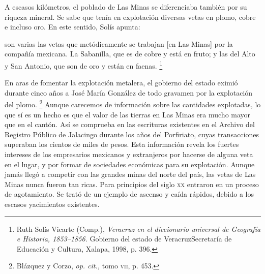 \documentclass[14pt,twoside,final]{extbook} %
\let\oldfootnote\footnote
\renewcommand\footnote[1]{%
\oldfootnote{\hspace{1mm}#1}}
\begin{document}
A escasos kilómetros, el poblado de Las Minas se diferenciaba también por su riqueza mineral. Se sabe que tenía en explotación diversas vetas en plomo, cobre e incluso oro. En este sentido, Solís apunta:
\begin{quoting}
son varias las vetas que metódicamente se trabajan [en Las Minas] por la compañía mexicana. La Sabanilla, que es de cobre y está en fruto; y las del Alto y San Antonio, que son de oro y están en faenas.\footnote{Ruth Solís Vicarte (Comp.), \emph{Veracruz en el diccionario universal de Geografía e Historia, 1853--1856.} Gobierno del estado de Veracruz\kernedslash Secretaría de Educación y Cultura, Xalapa, 1998, p. 396.}
\end{quoting}
En aras de fomentar la explotación metalera, el gobierno del estado eximió durante cinco años a José María González de todo gravamen por la explotación del plomo.\footnote{Blázquez y Corzo, \emph{op. cit.,} tomo \textsc{vii}, p. 453.} Aunque carecemos de información sobre las cantidades explotadas, lo que sí es un hecho es que el valor de las tierras en Las Minas era mucho mayor que en el cantón. Así se comprueba en las escrituras existentes en el Archivo del Registro Público de Jalacingo durante los años del Porfiriato, cuyas transacciones superaban los cientos de miles de pesos. Esta información revela los fuertes intereses de los empresarios mexicanos y extranjeros por hacerse de alguna veta en el lugar, y por formar de sociedades económicas para su explotación. Aunque jamás llegó a competir con las grandes minas del norte del país, las vetas de Las Minas nunca fueron tan ricas. Para principios del siglo \textsc{xx} entraron en un proceso de agotamiento. Se trató de un ejemplo de ascenso y caída rápidos, debido a los escasos yacimientos existentes.
\end{document}
